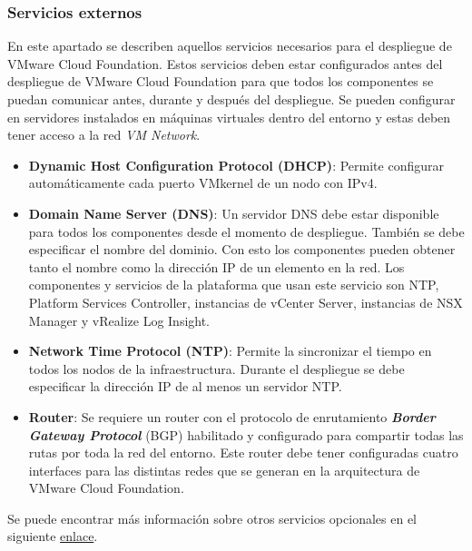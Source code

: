 \subsubsection{Servicios externos}
\label{subsubsec:servExterno}
En este apartado se describen aquellos servicios necesarios para el despliegue de VMware Cloud Foundation. Estos servicios deben estar configurados antes del despliegue de VMware Cloud Foundation para que todos los componentes se puedan comunicar antes, durante y después del despliegue. Se pueden configurar en servidores instalados en máquinas virtuales dentro del entorno y estas deben tener acceso a la red \textit{VM Network}.\\
\begin{itemize}
    
    \item \textbf{Dynamic Host Configuration Protocol (DHCP)}: Permite configurar automáticamente cada puerto VMkernel de un nodo con IPv4. 
    
    \item \textbf{Domain Name Server (DNS)}: Un servidor DNS debe estar disponible para todos los componentes desde el momento de despliegue. También se debe especificar el nombre del dominio. Con esto los componentes pueden obtener tanto el nombre como la dirección IP de un elemento en la red. Los componentes y servicios de la plataforma que usan este servicio son NTP, Platform Services Controller, instancias de vCenter Server, instancias de NSX Manager y vRealize Log Insight.
    
    \item \textbf{Network Time Protocol (NTP)}: Permite la sincronizar el tiempo en todos los nodos de la infraestructura. Durante el despliegue se debe especificar la dirección IP de al menos un servidor NTP.
    
    \item \textbf{Router}: Se requiere un router con el protocolo de enrutamiento \textit{\textbf{Border Gateway Protocol}} (BGP) habilitado y configurado para compartir todas las rutas por toda la red del entorno.
    Este router debe tener configuradas cuatro interfaces para las distintas redes que se generan en la arquitectura de VMware Cloud Foundation.
    
\end{itemize}

Se puede encontrar más información sobre otros servicios opcionales en el siguiente \href{https://docs.vmware.com/en/VMware-Cloud-Foundation/3.9/com.vmware.vcf.planprep.doc_39/GUID-F022BD3C-F11C-4EE6-83EA-ABE016E7A9B9.htm}{enlace}.
\FloatBarrier

